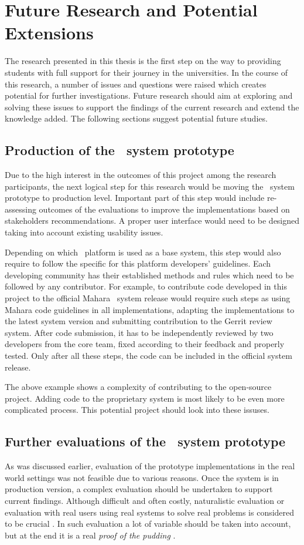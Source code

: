 \section{Future Research and Potential Extensions}
The research presented in this thesis is the first step on the way to providing
students with full support for their \LLLs journey in the universities. In the
course of this research, a number of issues and questions were raised which
creates potential for further investigations. Future research should aim at
exploring and solving these issues to support the findings of the current
research and extend the knowledge added. The following sections suggest
potential future studies.

\subsection{Production of the \ep~system prototype}
Due to the high interest in the outcomes of this project among the research
participants, the next logical step for this research would be moving the
\ep~system prototype to production level. Important part of this step would
include re-assessing outcomes of the evaluations to improve the implementations
based on stakeholders recommendations. A proper user interface would need to be
designed taking into account existing usability issues.

Depending on which \ep~platform is used as a base system, this step would also
require to follow the specific for this platform developers' guidelines. Each
developing community has their established methods and rules which need to be
followed by any contributor. For example, to contribute code developed in this
project to the official Mahara \ep~system release would require such steps as
using Mahara code guidelines in all implementations, adapting the
implementations to the latest system version and submitting contribution to the
Gerrit review system. After code submission, it has to be independently
reviewed by two developers from the core team, fixed according to their feedback
and properly tested. Only after all these steps, the code can be included in the
official system release.

The above example shows a complexity of contributing to the open-source project.
Adding code to the proprietary system is most likely to be even more complicated
process. This potential project should look into these issuses.

\subsection{Further evaluations of the \ep~system prototype}
As was discussed earlier, evaluation of the prototype implementations in the
real world settings was not feasible due to various reasons. Once the system is
in production version, a complex evaluation should be undertaken to support
current findings. Although difficult and often costly, naturalistic evaluation
or evaluation with real users using real systems to solve real problems is
considered to be crucial \citep{Pries-Heje2008}. In such evaluation a lot of
variable should be taken into account, but at the end it is a real \textit{proof
of the pudding} \citep{Venable2010}.

